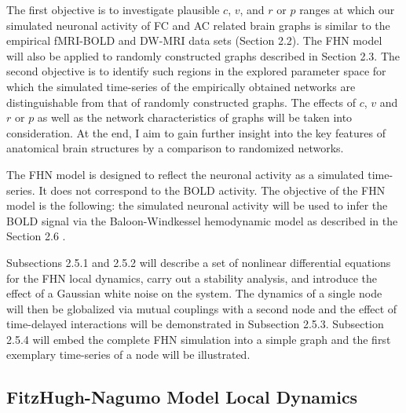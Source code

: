 The first objective is to investigate plausible $c$, $v$, and $r$ or $p$ ranges at which our simulated neuronal activity of FC and AC related brain graphs is similar to the empirical fMRI-BOLD and DW-MRI data sets (Section 2.2). The FHN model will also be applied to randomly constructed graphs described in Section 2.3. The second objective is to identify such regions in the explored parameter space for which the simulated time-series of the empirically obtained networks are distinguishable from that of randomly constructed graphs. The effects of $c$, $v$ and $r$ or $p$ as well as the network characteristics of graphs will be taken into consideration. At the end, I aim to gain further insight into the key features of anatomical brain structures by a comparison to randomized networks.  
 
The FHN model is designed to reflect the neuronal activity as a simulated time-series. It does not correspond to the BOLD activity. The objective of the FHN model is the following: the simulated neuronal activity will be used to infer the BOLD signal via the Baloon-Windkessel hemodynamic model as described in the Section 2.6 \citep{FRI00}. 

Subsections 2.5.1 and 2.5.2 will describe a set of nonlinear differential equations for the FHN local dynamics, carry out a stability analysis, and introduce the effect of a Gaussian white noise on the system. The dynamics of a single node will then be globalized via mutual couplings with a second node and the effect of time-delayed interactions will be demonstrated in Subsection 2.5.3. Subsection 2.5.4 will embed the complete FHN simulation into a simple graph and the first exemplary time-series of a node will be illustrated. 


\subsection{FitzHugh-Nagumo Model Local Dynamics}

